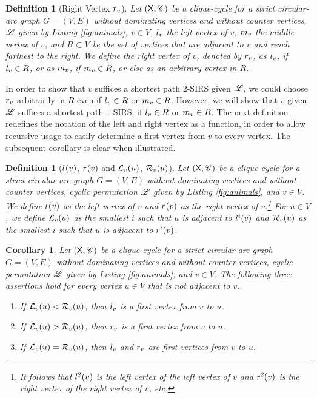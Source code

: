 \documentclass[10pt]{article}
\newtheorem{corollary}[theorem]{Corollary}
\newtheorem{definition}[theorem]{Definition}
\newcommand{\rvv}{\rv{v}}
\newcommand{\mvv}{\mv{v}}
\begin{document}
\begin{definition}[Right Vertex $\rvv$]\label{de_r_v}
Let $(\mc{X},\ri{C})$ be a clique-cycle for a strict cir\-cu\-lar-arc graph $G=(V,E)$ without 
dominating vertices and without counter vertices, $\ri{L}$ given by Listing \ref{fig:animals}, 
$v\in V$, $\lvv$ the left vertex of $v$, $\mvv$ the middle vertex of $v$, and $R\subset V$ be the 
set of vertices that are adjacent to $v$ and reach farthest to the right.
We define the \emph{right vertex of $v$}, denoted by $\rvv$,  as $\lvv$, if $\lvv\in R$, or 
as $\mvv$, if $\mvv\in R$, or else as an arbitrary vertex in $R$.
\end{definition}
In order to show that $v$ suffices a shortest path 2-SIRS given $\ri{L}$, we could choose $\rvv$ arbitrarily in $R$ even if $\lvv\in R$ or $\mvv\in R$.
However, we will show that $v$ given $\ri{L}$ suffices a 
shortest path $1$-SIRS, if $\lvv\in R$ or $\mvv\in R$.
The next definition redefines the notation of the left and right vertex as a 
function, in order to allow 
recursive usage to easily determine a first vertex from $v$ to every vertex.
The subsequent corollary is clear when illustrated.

\begin{definition}[$\lvi{v}{}$,  $\rvi{v}{}$ and $\lvd{u}$, $\rvd{u}$]\label{lvi}
Let $(\mc{X},\ri{C})$ be a clique-cycle for a strict circular-arc graph $G=(V,E)$ without 
dominating vertices and without counter vertices, cyclic permutation 
$\ri{L}$ given by Listing \ref{fig:animals}, 
and $v\in V$. We define $\lvi{v}{}$ as the left vertex of $v$ and $\rvi{v}{}$ as the right vertex 
of $v$.\footnote{It follows that $\lvi{v}{2}$ is the left vertex of the left vertex of $v$ and $\rvi{v}{2}$ 
is the right vertex of the right vertex of $v$, etc.}
For $u\in V$, we define $\lvd{u}$ as the smallest $i$ such that $u$ is adjacent to $\lvi{v}{i}$ and  
$\rvd{u}$ as the smallest $i$ such that $u$ is adjacent to $\rvi{v}{i}$.
\end{definition}




\begin{corollary}\label{b}
Let $(\mc{X},\ri{C})$ be a clique-cycle for a strict circular-arc 
graph $G=(V,E)$ without dominating vertices and without counter 
vertices, cyclic permutation 
$\ri{L}$ given by Listing \ref{fig:animals}, 
and $v\in V$. The following three assertions hold for every 
vertex $u\in V$ that is not adjacent to $v$.
\begin{enumerate}
\item\label{jans}
If
$\lvd{u}<\rvd{u}$, then $\lvv$ is a first vertex from $v$ to $u$.
\item\label{jans2}
If
$\lvd{u}>\rvd{u}$, then $\rvv$ is a first vertex from $v$ to $u$.
\item\label{jans3}
If
$\lvd{u}=\rvd{u}$, then $\lvv$ and $\rvv$ are first vertices from $v$ to $u$.
\end{enumerate}
\end{corollary}
\end{document}
